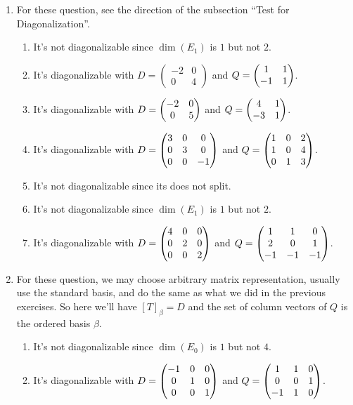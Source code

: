 \begin{enumerate}
\item For these question, see the direction of the subsection ``Test for Diagonalization''.
\begin{enumerate}
\item It's not diagonalizable since $\dim(E_1)$ is $1$ but not $2$.
\item It's diagonalizable with $D=\begin{pmatrix}-2&0\\0&4\end{pmatrix}$ and $Q=\begin{pmatrix}1 & 1\cr -1 & 1\end{pmatrix}$.
\item It's diagonalizable with $D=\begin{pmatrix}-2 & 0\cr 0 & 5\end{pmatrix}$ and $Q=\begin{pmatrix}4 & 1\cr -3 & 1\end{pmatrix}$.
\item It's diagonalizable with $D=\begin{pmatrix}3 & 0 & 0\cr 0 & 3 & 0\cr 0 & 0 & -1\end{pmatrix}$ and $Q=\begin{pmatrix}1 & 0 & 2\cr 1 & 0 & 4\cr 0 & 1 & 3\end{pmatrix}$.
\item It's not diagonalizable since its \charpoly{} does not split.
\item It's not diagonalizable since $\dim(E_1)$ is $1$ but not $2$.
\item It's diagonalizable with $D=\begin{pmatrix}4 & 0 & 0\cr 0 & 2 & 0\cr 0 & 0 & 2\end{pmatrix}$ and $Q=\begin{pmatrix}1 & 1 & 0\cr 2 & 0 & 1\cr -1 & -1 & -1\end{pmatrix}$.
\end{enumerate}
\item For these question, we may choose arbitrary matrix representation, usually use the standard basis, and do the same as what we did in the previous exercises. So here we'll have $[T]_{\beta}=D$ and the set of column vectors of $Q$ is the ordered basis $\beta$.
\begin{enumerate}
\item It's not diagonalizable since $\dim(E_0)$ is $1$ but not $4$.
\item It's diagonalizable with $D=\begin{pmatrix}-1 & 0 & 0\cr 0 & 1 & 0\cr 0 & 0 & 1\end{pmatrix}$ and $Q=\begin{pmatrix}1 & 1 & 0\cr 0 & 0 & 1\cr -1 & 1 & 0\end{pmatrix}$.

\end{enumerate}
\end{enumerate}
